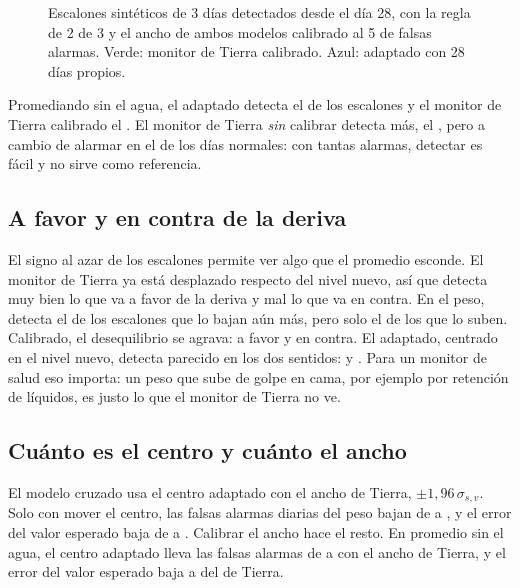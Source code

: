 \begin{figure}[htbp]

\caption[Escalones detectados con las mismas falsas alarmas]{Escalones sintéticos de 3 días detectados desde el día
28, con la regla de 2 de 3 y el ancho de ambos modelos calibrado al 5\pct{} de falsas alarmas. Verde: monitor de
Tierra calibrado. Azul: adaptado con 28 días propios.}
\label{fig:deteccion}
\end{figure}

Promediando sin el agua, el adaptado detecta el \pct{} de los escalones y el monitor de Tierra
calibrado el \pct. El monitor de Tierra \emph{sin} calibrar detecta más, el
\pct, pero a cambio de alarmar en el \pct{} de los días normales: con
tantas alarmas, detectar es fácil y no sirve como referencia.

\subsection{A favor y en contra de la deriva}

El signo al azar de los escalones permite ver algo que el promedio esconde. El monitor de Tierra ya está desplazado
respecto del nivel nuevo, así que detecta muy bien lo que va a favor de la deriva y mal lo que va en contra. En el peso,
detecta el \pct{} de los escalones que lo bajan aún más, pero solo el
\pct{} de los que lo suben. Calibrado, el desequilibrio se agrava: \pct{}
a favor y \pct{} en contra. El adaptado, centrado en el nivel nuevo, detecta parecido en
los dos sentidos:  y \pct. Para un monitor de salud eso
importa: un peso que sube de golpe en cama, por ejemplo por retención de líquidos, es justo lo que el monitor de
Tierra no ve.

\subsection{Cuánto es el centro y cuánto el ancho}

El modelo cruzado  usa el centro adaptado con el ancho de Tierra,
$\pm1{,}96\,\sigma_{s,v}$. Solo con mover el centro, las falsas alarmas diarias del peso bajan de
 a \pct, y el error del valor esperado baja de
 a . Calibrar el ancho hace el resto. En promedio sin el agua, el
centro adaptado lleva las falsas alarmas de  a \pct{} con el ancho
de Tierra, y el error del valor esperado baja a  del de Tierra.

